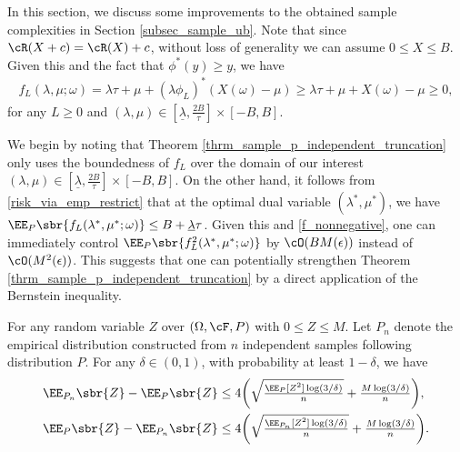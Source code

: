 \documentclass[9pt]{article} %
\numberwithin{equation}{section}
\renewcommand{\frac}[2]{\tfrac{#1}{#2}}
\begin{document}
In this section, we discuss some improvements to the obtained sample complexities in Section \ref{subsec_sample_ub}. 
Note that since $\cR(X+ c) = \cR(X) + c$, without loss of generality we can assume $0 \leq X \leq B$. 
Given this and the fact that  $\phi^*(y) \geq y$,   we have
\begin{align}\label{f_nonnegative}
f_L(\lambda, \mu; \omega) =  \lambda \tau + \mu + (\lambda \phi_L)^*(X(\omega) - \mu)
\geq  \lambda \tau + \mu + X(\omega) - \mu \geq 0,
\end{align}
for any $L \geq 0$ and $(\lambda, \mu) \in  [\underline{\lambda}, \frac{2B}{\tau}] \times [-B, B]$. 

We begin by noting that Theorem \ref{thrm_sample_p_independent_truncation} only uses the boundedness of $f_L$ over the domain of our interest $(\lambda, \mu) \in [\underline{\lambda}, \frac{2B}{\tau}] \times [-B, B]$.
On the other hand, it follows from \eqref{risk_via_emp_restrict} that at the optimal dual variable $(\lambda^*, \mu^*)$, we have $\EE_P \sbr{f_L(\lambda^*, \mu^*; \omega) }  \leq B + \underline{\lambda} \tau$. 
Given this and \eqref{f_nonnegative}, one can immediately control $\EE_P \sbr{f_L^2(\lambda^*, \mu^*; \omega)}$ by  $\cO(B M (\epsilon) )$ instead of $\cO(M^2(\epsilon))$.   
This suggests that one can potentially strengthen Theorem \ref{thrm_sample_p_independent_truncation} by a direct application of the Bernstein  inequality.

\begin{lemma}\label{lemma_two_side_bernstein}
For any random variable $Z$ over $(\Omega, \cF, P)$ with $0 \leq Z \leq M$. 
Let $P_n$ denote the empirical distribution constructed from $n$ independent samples following distribution $P$. 
For any $\delta \in (0,1)$, with probability at least $1-\delta$, we have
\begin{align}
{ \EE_{P_n} \sbr{Z}  - \EE_P \sbr{Z} } & \leq  4  \bigg({
\sqrt{\frac{  { \EE_P [{Z^2}]} \log(3/\delta)}{n}} + \frac{M \log(3/\delta)}{n} 
} \bigg),  \label{eq_bernstein_1} \\
{  \EE_P \sbr{Z} - \EE_{P_n} \sbr{Z}   } & \leq  4 \bigg({
\sqrt{\frac{  { \EE_{P_n} [{Z^2}]} \log(3/\delta)}{n}} + \frac{M \log(3/\delta)}{n} 
} \bigg). \label{eq_bernstein_2}
\end{align} 
\end{lemma}
\end{document}
